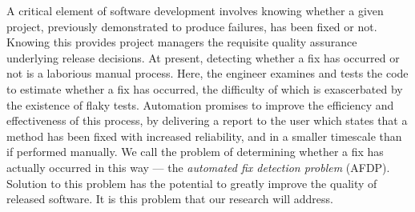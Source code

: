 
A critical element of software development involves knowing whether a given project, previously demonstrated to produce failures, has been fixed or not. Knowing this provides project managers the requisite quality assurance underlying release decisions. 
At present, detecting whether a fix has occurred or not is a laborious manual process. Here, the engineer examines and tests the code to estimate whether a fix has occurred, the difficulty of which is exascerbated by the existence of flaky tests. Automation promises to improve the efficiency and effectiveness of this process, by delivering a report to the user which states that a method has been fixed with increased reliability, and in a smaller timescale than if performed manually. We call the problem of determining whether a fix has actually occurred in this way --- the \textit{automated fix detection problem} (AFDP). Solution to this problem has the potential to greatly improve the quality of released software. It is this problem that our research will address. 

